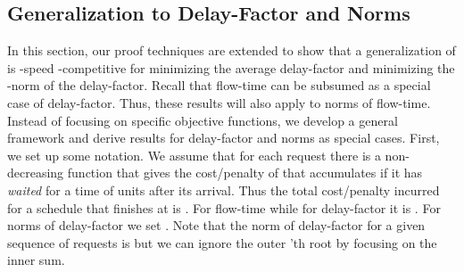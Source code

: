 \documentclass[11pt]{article}
\newtheorem{theorem}[lemma]{Theorem}
\begin{document}
\begin{titlepage}
\iffalse In this section, we further improve the speed from  to  in the discrete time model.
\begin{theorem}
\label{thm:4spd}
 is -speed -competitive.
\end{theorem}
In Section~\ref{sec:5speed} early requests of each non-self-chargeable
event  were charged to events that ended on roughly the last
half of . This is because Lemma~\ref{lem:close}
does not provide a good comparison between  and flow time
of events which are done close to . In this section, we show
how all the events ending during  can be used
to pay for . To do this, non-self-chargeable events in 
are partitioned into two disjoint sets  and
. For simplicity, event  is said to have  if 
ends during .  Non-self-chargeable event
 is said to be  and in  if it has at least  self-chargeable events where  is
some constant to be fixed later. The rest of the events in  are in
 and said to be .  The  events can be charged to the
optimal solution because it has many self-chargeable events. For each
 event, we will bound  with events which end at
. Recall that Lemma~\ref{lem:close} cannot compare
 and , where . Thus we find a
\emph{bridge} events , and compare  with 
and  with , thereby  with .
\fi \vspace{-3mm}

\section{Generalization to Delay-Factor and   Norms}\vspace{-1mm}
\label{sec:metrics} \vspace{-2mm} In this section, our proof
techniques are extended to show that a generalization of  is
-speed -competitive for minimizing the average
delay-factor and minimizing the -norm of the delay-factor.
Recall that flow-time can be subsumed as a special case of
delay-factor. Thus, these results will also apply to  norms of
flow-time. Instead of focusing on specific objective functions, we
develop a general framework and derive results for delay-factor and
 norms as special cases. First, we set up some notation. We
assume that for each request  there is a non-decreasing
function  that gives the cost/penalty of that 
accumulates if it has {\em waited} for a time of  units after its
arrival. Thus the total cost/penalty incurred for a schedule that
finishes  at  is . For
flow-time  while for delay-factor it is . For  norms of delay-factor
we set .
Note that the  norm of delay-factor for a given sequence of
requests is  but we can
ignore the outer 'th root by focusing on the inner sum.


\end{titlepage}
\end{document}
